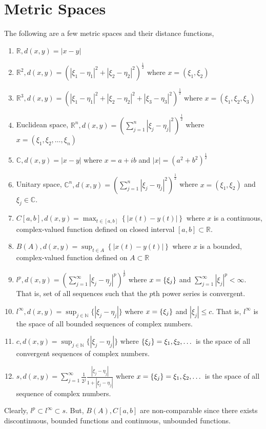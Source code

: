 \section{Metric Spaces}
The following are a few metric spaces and their distance functions,
\begin{enumerate}
	\item $\mathbb{R}, d(x,y) = |x -y|$
	\item $\mathbb{R}^2, d(x,y) = \left( |\xi_1-\eta_1|^2 + |\xi_2 - \eta_2|^2 \right)^\frac{1}{2} $ where $x = (\xi_1,\xi_2)$
	\item $\mathbb{R}^3, d(x,y) = \left( |\xi_1-\eta_1|^2 + |\xi_2 - \eta_2|^2 + |\xi_3-\eta_3|^2 \right)^\frac{1}{2} $ where $x = (\xi_1,\xi_2,\xi_3)$
	\item Euclidean space, $\displaystyle \mathbb{R}^n, d(x,y) = \left( \sum_{j=1}^n |\xi_j - \eta_j|^2 \right)^\frac{1}{2}$ where $x = (\xi_1,\xi_2,\dots,\xi_n)$
	\item $\mathbb{C}, d(x,y) = |x - y|$ where $x = a+ib$ and $|x| = (a^2+b^2)^\frac{1}{2}$
	\item Unitary space, $\displaystyle \mathbb{C}^n, d(x,y) =  \left( \sum_{j=1}^n |\xi_j - \eta_j|^2 \right)^\frac{1}{2}$ where  $x = (\xi_1,\xi_2)$ and $\xi_j \in \mathbb{C}$.
	\item $\displaystyle C[a,b], d(x,y) = \max_{t \in [a,b]} \left\{ |x(t)-y(t)| \right\}$ where $x$ is a continuous, complex-valued function defined on closed interval $[a,b] \subset \mathbb{R}$.
	\item $\displaystyle B(A), d(x,y) = \sup_{t \in A} \left\{ |x(t)-y(t)| \right\}$ where $x$ is a bounded, complex-valued function defined on $A \subset \mathbb{R}$
	\item $\displaystyle l^p, d(x,y) = \left( \sum_{j = 1}^\infty |\xi_j - \eta_j|^p \right)^\frac{1}{p}$ where $x = \left\{\xi_j\right\}$ and $\displaystyle \sum_{j=1}^\infty |\xi_j|^p < \infty$. That is, set of all sequences such that the $p$th power series is convergent.
	\item $\displaystyle l^\infty, d(x,y) = \sup_{j \in \mathbb{N}} \{ |\xi_j - \eta_j| \} $ where $x = \left\{\xi_j\right\}$ and $|\xi_j| \le c$. That is, $l^\infty$ is the space of all bounded sequences of complex numbers.
	\item $\displaystyle c, d(x,y) = \sup_{j \in \mathbb{N}} \{ |\xi_j - \eta_j| \}$ where $\left\{\xi_j\right\} = \xi_1,\xi_2,\dots$ is the space of all convergent sequences of complex numbers.
	\item $\displaystyle s, d(x,y) = \sum_{j = 1}^\infty \frac{1}{2^j} \frac{|\xi_j - \eta_j|}{1+|\xi_j-\eta_j|}$ where $x = \left\{\xi_j\right\} = \xi_1,\xi_2,\dots$ is the space of all sequence of complex numbers.
\end{enumerate}
Clearly, $l^p \subset l^\infty \subset s$.
But, $B(A),C[a,b]$ are non-comparable since there exists discontinuous, bounded functions and continuous, unbounded functions.

